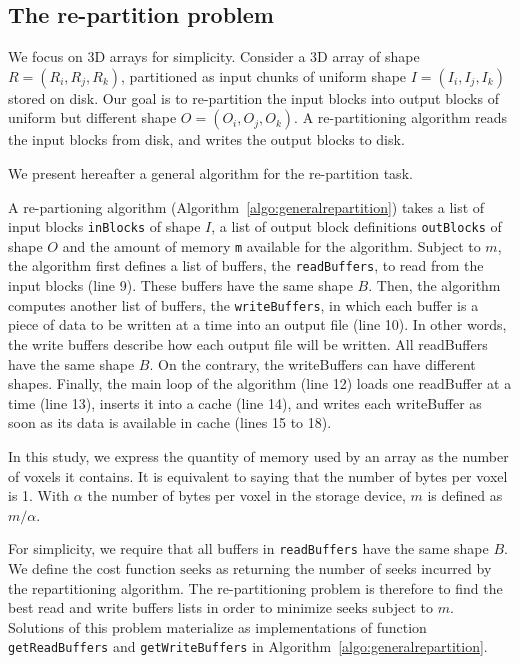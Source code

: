 \documentclass[conference]{IEEEtran}
\begin{document}
\subsection{The re-partition problem}
We focus on 3D arrays for simplicity. Consider a 3D array of shape $R =
(R_i, R_j, R_k)$, partitioned as input chunks of uniform shape $I = (I_i,
I_j, I_k)$ stored on disk. Our goal is to re-partition the input blocks into
output blocks of uniform but different shape $O = (O_i, O_j, O_k)$.
A re-partitioning algorithm reads the input blocks from disk, and writes the
output blocks to disk.

We present hereafter a general algorithm for the re-partition task.

A re-partioning algorithm (Algorithm~\ref{algo:generalrepartition}) takes a
list of input blocks \texttt{inBlocks} of shape $I$, a list of output block
definitions \texttt{outBlocks} of shape $O$ and the amount of memory \texttt{m}
available for the algorithm.
Subject to $m$, the algorithm first defines a list of buffers, the
\texttt{readBuffers}, to read from the input blocks (line 9).
These buffers have the same shape $B$.
Then, the algorithm computes another list of buffers, the \texttt{writeBuffers},
in which each buffer is a piece of data to be written at a time into an
output file (line 10).
In other words, the write buffers describe how each output file will be written.
All readBuffers have the same shape $B$. On the contrary, the writeBuffers can
have different shapes.
Finally, the main loop of the algorithm (line 12) loads one readBuffer at a
time (line 13), inserts it into a cache (line 14), and writes each writeBuffer
as soon as its data is available in cache (lines 15 to 18).

In this study, we express the quantity of memory used by an array as the
number of voxels it contains. It is equivalent to saying that the number of
bytes per voxel is 1. With $\alpha$ the number of bytes per voxel in the storage
device, $m$ is defined as $m/\alpha$.

For simplicity, we require that all buffers in \texttt{readBuffers} have
the same shape $B$. We define the cost function $\mathrm{seeks}$ as returning
the number of seeks incurred by the repartitioning algorithm.
The re-partitioning problem is therefore to find the best read and write buffers
lists in order to minimize $\mathrm{seeks}$ subject to $m$.
Solutions of this problem materialize as implementations of function
\texttt{getReadBuffers} and \texttt{getWriteBuffers} in
Algorithm~\ref{algo:generalrepartition}.
\end{document}
